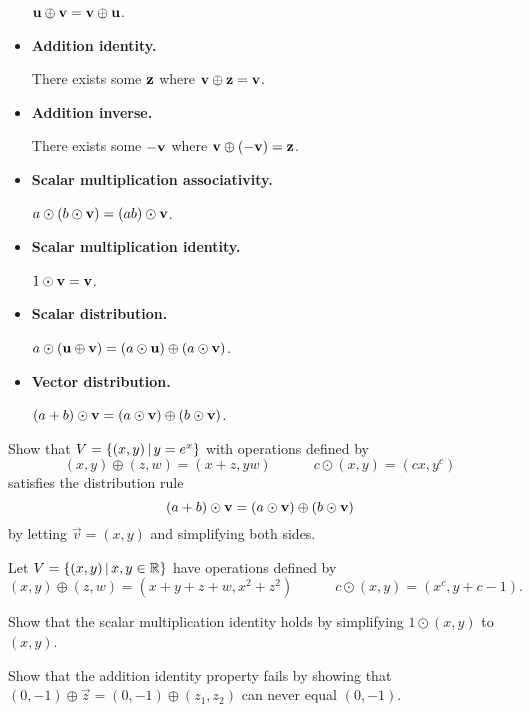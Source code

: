 \begin{applicationActivities}
\begin{observation}
\begin{multicols}{2}
\begin{itemize}
            \(\mathbf u\oplus\mathbf v=
            \mathbf v\oplus\mathbf u\).
      \item \textbf{Addition identity.}

            There exists some \(\mathbf z\)
            where \(\mathbf v\oplus\mathbf z=\mathbf v\).
      \item \textbf{Addition inverse.}

            There exists some \(-\mathbf v\)
            where \(\mathbf v\oplus(-\mathbf v)=\mathbf z\).
      \item \textbf{Scalar multiplication associativity.}

            \(a\odot(b\odot\mathbf v)=(ab)\odot\mathbf v\).
      \item \textbf{Scalar multiplication identity.}

            \(1\odot\mathbf v=\mathbf v\).
      \item \textbf{Scalar distribution.}

            \(a\odot(\mathbf u\oplus\mathbf v)=
            (a\odot\mathbf u)\oplus (a\odot\mathbf v)\).
      \item \textbf{Vector distribution.}

            \((a+b)\odot\mathbf v=(a\odot\mathbf v)\oplus (b\odot\mathbf v)\).
    \end{itemize}
    \end{multicols}
\end{observation}


\begin{activity}{10}
  Show that \(V=\left\{(x,y)\,\middle|\,y=e^x\right\}\) with operations defined by
  \[
    (x,y)\oplus (z,w)=(x+z,yw)
      \hspace{3em}
    c\odot (x,y)=(cx,y^c)
  \]
  satisfies the distribution rule
  \[(a+b)\odot\mathbf v=(a\odot\mathbf v)\oplus (b\odot\mathbf v)\]
  by letting \(\vec v=(x,y)\) and simplifying both sides.
\end{activity}


\begin{activity}{15}
  Let \(V=\left\{(x,y)\,\middle|\,x,y\in\mathbb{R}\right\}\) have operations defined by
  \[
    (x,y)\oplus (z,w)=(x+y+z+w,x^2+z^2)
      \hspace{3em}
    c\odot (x,y)=(x^c,y+c-1)
  .\]

  \begin{subactivity}
    Show that the scalar multiplication identity holds by
    simplifying \(1\odot(x,y)\) to \((x,y)\).
  \end{subactivity}

  \begin{subactivity}
    Show that the addition identity property fails by
    showing that \((0,-1)\oplus\vec z=(0,-1)\oplus(z_1,z_2)\)
    can never equal \((0,-1)\).
  \end{subactivity}


\end{activity}
\end{applicationActivities}

